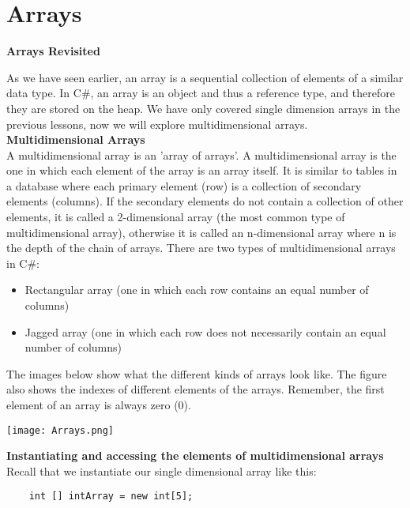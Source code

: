 \section{Arrays}

\textbf{Arrays Revisited}

As we have seen earlier, an array is a sequential collection of elements of a similar data type. In C\#, an array is an
object and thus a reference type, and therefore they are stored on the heap. We have only covered single dimension
arrays in the previous lessons, now we will explore multidimensional arrays.\\

\textbf{Multidimensional Arrays}\\

A multidimensional array is an ’array of arrays’. A multidimensional array is the one in which each element of the
array is an array itself. It is similar to tables in a database where each primary element (row) is a collection of
secondary elements (columns). If the secondary elements do not contain a collection of other elements, it is called
a 2-dimensional array (the most common type of multidimensional array), otherwise it is called an n-dimensional
array where n is the depth of the chain of arrays. There are two types of multidimensional arrays in C\#:

\begin{itemize}
    \item Rectangular array (one in which each row contains an equal number of columns)
    \item Jagged array (one in which each row does not necessarily contain an equal number of columns) 
\end{itemize}

The images below show what the different kinds of arrays look like. The figure also shows the indexes of different
elements of the arrays. Remember, the first element of an array is always zero (0).

\texttt{[image: Arrays.png]}


\textbf{Instantiating and accessing the elements of multidimensional arrays}\\

Recall that we instantiate our single dimensional array like this:\\

\begin{lstlisting}
    int [] intArray = new int[5];    
\end{lstlisting}

